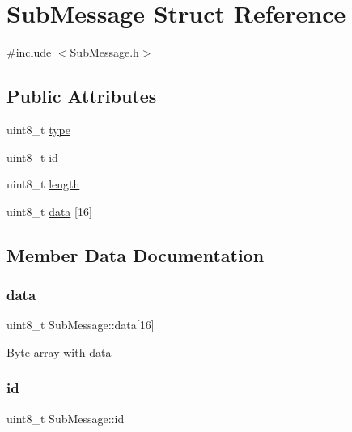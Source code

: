 \hypertarget{struct_sub_message}{}\section{Sub\+Message Struct Reference}
\label{struct_sub_message}


{\ttfamily \#include $<$Sub\+Message.\+h$>$}

\subsection*{Public Attributes}
\begin{DoxyCompactItemize}
\item 
uint8\+\_\+t \hyperlink{struct_sub_message_a064f1d26d553da776dc749d37a18a499}{type}
\item 
uint8\+\_\+t \hyperlink{struct_sub_message_af3acc450c0686d7a9d15ccd9d548cb6d}{id}
\item 
uint8\+\_\+t \hyperlink{struct_sub_message_a276e06f5335ca7857c21ac8c0e51bd6d}{length}
\item 
uint8\+\_\+t \hyperlink{struct_sub_message_a7d923c5cdaa380c27d7c4cf60ea7c1be}{data} \mbox{[}16\mbox{]}
\end{DoxyCompactItemize}


\subsection{Member Data Documentation}
\mbox{\label{struct_sub_message_a7d923c5cdaa380c27d7c4cf60ea7c1be}} 
\subsubsection{\texorpdfstring{data}{data}}
{\footnotesize\ttfamily uint8\+\_\+t Sub\+Message\+::data\mbox{[}16\mbox{]}}

Byte array with data \mbox{\label{struct_sub_message_af3acc450c0686d7a9d15ccd9d548cb6d}} 
\subsubsection{\texorpdfstring{id}{id}}
{\footnotesize\ttfamily uint8\+\_\+t Sub\+Message\+::id}

